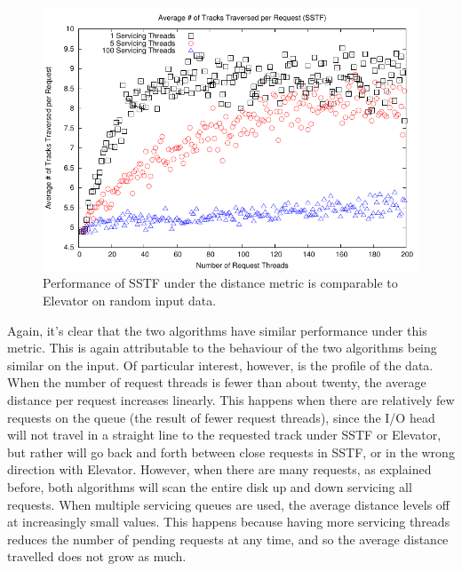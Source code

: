 \documentclass[12pt]{report}
\begin{document}
\begin{figure}[htb!]
    \centering
    \includegraphics[scale=1]{distanceSSTF.pdf}
    \caption{Performance of SSTF under the distance metric is comparable to Elevator on
    random input data.}
    \label{fig:distanceSSTF}
\end{figure}
\newpage
Again, it's clear that the two algorithms have similar performance under this metric. This
is again attributable to the behaviour of the two algorithms being similar on the input.
Of particular interest, however, is the profile of the data. When the number of request
threads is fewer than about twenty, the average distance per request increases linearly.
This happens when there are relatively few requests on the queue
(the result of fewer request threads), since the I/O head will not travel in a straight line to
the requested track under SSTF or Elevator, but rather will go back and forth between
close requests in SSTF, or in the wrong direction with Elevator. However, when there are
many requests, as explained before, both algorithms will scan the entire disk up and down
servicing all requests. When multiple servicing queues are used, the average distance 
levels off at increasingly
small values. This happens because having more servicing threads reduces the number of
pending requests at any time, and so the average distance travelled does not grow as
much.
\end{document}
